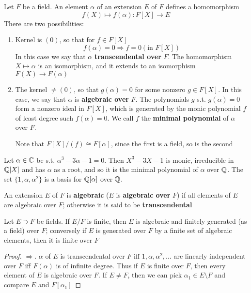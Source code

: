 \documentclass[11pt]{article}
\begin{document}
Let \(F\) be a field. An element \(\alpha\) of an extension \(E\) of \(F\) defines a homomorphism
\begin{equation*}
f(X)\mapsto f(\alpha):F[X]\to E
\end{equation*}
There are two possibilities:
\begin{enumerate}
\item Kernel is \((0)\), so that for \(f\in F[X]\)
\begin{equation*}
f(\alpha)=0\Rightarrow f=0 (\text{in }F[X])
\end{equation*}
In this case we say that \(\alpha\) \textbf{transcendental over} \(F\). The homomorphism \(X\mapsto\alpha\) is an
isomorphism, and it extends to an isomorphism \(F(X)\to F(\alpha)\)
\item The kernel \(\neq(0)\), so that \(g(\alpha)=0\) for some nonzero \(g\in F[X]\). In this case, we say
that \(\alpha\) is \textbf{algebraic over} \(F\).  The polynomials \(g\) s.t. \(g(\alpha)=0\) form a nonzero ideal
in \(F[X]\), which is generated by the monic polynomial \(f\) of least degree
such \(f(\alpha)=0\). We call \(f\) the \textbf{minimal polynomial} of \(\alpha\) over \(F\).

Note that \(F[X]/(f)\cong F[\alpha]\), since the first is a field, so is the second
\end{enumerate}


\begin{examplle}[]
Let \(\alpha\in\mathbb{C}\) be s.t. \(\alpha^3-3\alpha-1=0\). Then \(X^3-3X-1\) is monic, irreducible in \(\mathbb{Q}[X]\) and  has
\(\alpha\) as a root, and so it is the minimal polynomial of \(\alpha\) over \(\mathbb{Q}\). The set \(\{1,\alpha,\alpha^2\}\) is a
basis for \(\mathbb{Q}[\alpha]\) over \(\mathbb{Q}\).
\end{examplle}

An extension \(E\) of \(F\) is \textbf{algebraic} (\(E\) is \textbf{algebraic over} \(F\)) if all elements
of \(E\) are algebraic over \(F\); otherwise it is said to be \textbf{transcendental}

\begin{proposition}[]
Let \(E\supset F\) be fields. If \(E/F\) is finite, then \(E\) is algebraic and finitely generated (as
a field) over \(F\); conversely if \(E\) is generated over \(F\) by a finite set of algebraic
elements, then it is finite over \(F\)
\end{proposition}

\begin{proof}
\(\Rightarrow\). \(\alpha\) of \(E\) is transcendental over \(F\) iff \(1,\alpha,\alpha^2,\dots\) are linearly independent
over \(F\) iff \(F(\alpha)\) is of infinite degree. Thus if \(E\) is finite over \(F\), then every
element of \(E\) is algebraic over \(F\). If \(E\neq F\), then we can pick \(\alpha_1\in E\setminus F\) and
compare \(E\) and \(F[\alpha_1]\)
\end{proof}
\end{document}
